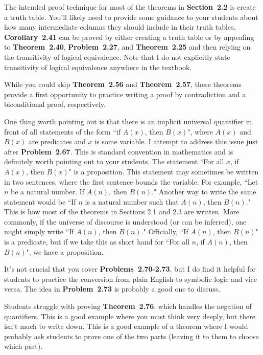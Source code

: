 \documentclass[11pt]{article}%
\newcommand{\blankline}{\pagebreak[2]\vspace{.5\baselineskip}}
\begin{document}
\blankline

The intended proof technique for most of the theorems in \textbf{Section~2.2} is create a truth table.  You'll likely need to provide some guidance to your students about how many intermediate columns they should include in their truth tables.  \textbf{Corollary~2.41} can be proved by either creating a truth table or by appealing to \textbf{Theorem~2.40}, \textbf{Problem~2.27}, and \textbf{Theorem~2.25} and then relying on the transitivity of logical equivalence. Note that I do not explicitly state transitivity of logical equivalence anywhere in the textbook.

\blankline

While you could skip \textbf{Theorem~2.56} and \textbf{Theorem~2.57}, these theorems provide a first opportunity to practice writing a proof by contradiction and a biconditional proof, respectively.

\blankline

One thing worth pointing out is that there is an implicit universal quantifier in front of all statements of the form ``if $A(x)$, then $B(x)$", where $A(x)$ and $B(x)$ are predicates and $x$ is some variable. I attempt to address this issue just after \textbf{Problem~2.67}. This is standard convention in mathematics and is definitely worth pointing out to your students. The statement ``For all $x$, if $A(x)$, then $B(x)$" is a proposition. This statement may sometimes be written in two sentences, where the first sentence bounds the variable. For example, ``Let $n$ be a natural number. If $A(n)$, then $B(n)$." Another way to write the same statement would be ``If $n$ is a natural number such that $A(n)$, then $B(n)$." This is how most of the theorems in Sections 2.1 and 2.3 are written. More commonly, if the universe of discourse is understood (or can be inferred), one might simply write ``If $A(n)$, then $B(n)$."  Officially, ``If $A(n)$, then $B(n)$" is a predicate, but if we take this as short hand for ``For all $n$, if $A(n)$, then $B(n)$", we have a proposition.  

\blankline

It's not crucial that you cover \textbf{Problems~2.70-2.73}, but I do find it helpful for students to practice the conversion from plain English to symbolic logic and vice versa.  The idea in \textbf{Problem~2.73} is probably a good one to discuss.

\blankline

Students struggle with proving \textbf{Theorem~2.76}, which handles the negation of quantifiers.  This is a good example where you must think very deeply, but there isn't much to write down.  This is a good example of a theorem where I would probably ask students to prove one of the two parts (leaving it to them to choose which part).
\end{document}
